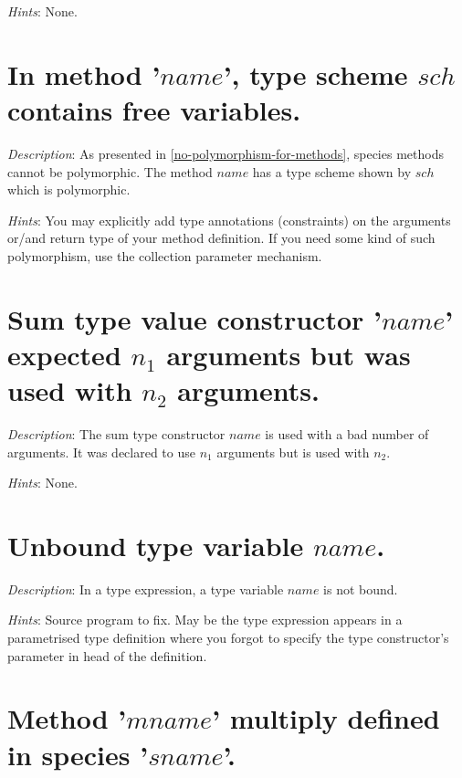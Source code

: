 {\em Hints}: None.



\section*{In method '$name$', type scheme $sch$ contains free variables.}

{\em Description}: As presented in \ref{no-polymorphism-for-methods},
species methods cannot be polymorphic. The method $name$ has a
 type scheme shown by $sch$  which is polymorphic. 

{\em Hints}:  You may explicitly add type
annotations (constraints) on the arguments or/and return type of your
method definition. If you need some kind of such polymorphism, use the
collection parameter mechanism. 




\section*{Sum type  value constructor '$name$' expected $n_1$ arguments but
  was used with $n_2$ arguments.}

{\em Description}: The sum type constructor $name$ is used with a bad
number of arguments. It was declared to use $n_1$ arguments but is
used with $n_2$.

{\em Hints}: None.



\section*{Unbound type variable $name$.}

{\em Description}: In a type expression, a type variable $name$ is not
bound.

{\em Hints}: Source program to fix. May be the type expression appears
in a parametrised type definition where you forgot to specify the type
constructor's parameter in head of the definition.



\section*{Method '$mname$' multiply defined in species '$sname$'.}

